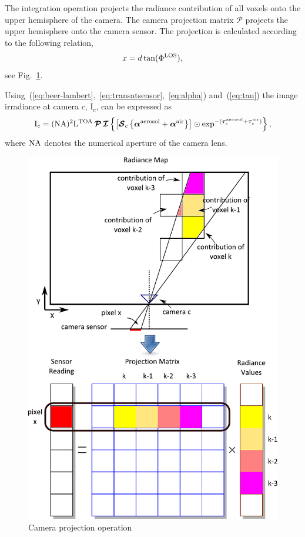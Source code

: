 \documentclass[10pt,twocolumn,letterpaper]{article}
\newcommand{\OpSphere}{\bm{\mathcal{S}}}
\newcommand{\OpInt}{\bm{\mathcal{I}}}
\newcommand{\OpCamera}{\bm{\mathcal{P}}}
\newcommand{\curly}[1]{\left\{#1\right\}}
\newcommand{\recty}[1]{\left[#1\right]}
\newcommand{\vect}[1]{\bm{#1}}
\begin{document}
The integration operation projects the radiance contribution of all
voxels onto the upper hemisphere of the camera. The camera projection
matrix $\OpCamera$ projects the upper hemisphere onto the camera
sensor. The projection is calculated according to the following
relation,
\begin{align}
  x = d \tan(\Phi^{\rm LOS}),
\end{align}
see Fig.~\ref{fig:projection}.

Using~(\ref{eq:beer-lambert},~\ref{eq:transatsensor},~\ref{eq:alpha})
and~(\ref{eq:tau}) the image irradiance at camera $c$, $\mathrm{I}_c$,
can be expressed as
\begin{align}
  \mathrm{I}_c=({\rm NA})^2\mathrm{L}^{\rm TOA} \, \OpCamera \, \OpInt
  \curly{\recty{\OpSphere_c \curly{\vect{\alpha}^{\rm aerosol} +
        \vect{\alpha}^{\rm air}}} \odot \exp^{-(\vect{\tau}_c^{\rm
        aerosol} + \vect{\tau}_c^{\rm air})}},
  \label{eq:atsensor}
\end{align}
where $\rm{NA}$ denotes the numerical aperture of the camera lens.

\begin{figure}

  \centering
    \includegraphics[width=\columnwidth]{images/sensor.pdf}
  \caption{Camera projection operation}
  \label{fig:projection}
\end{figure}
\end{document}
